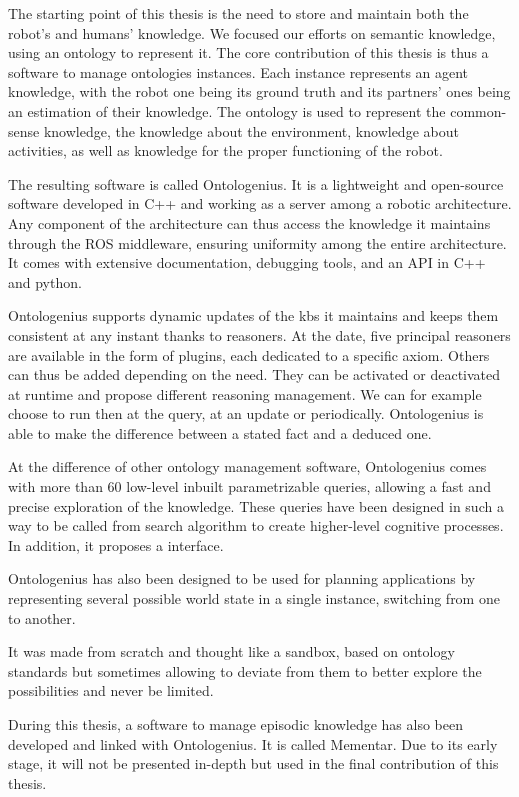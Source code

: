 The starting point of this thesis is the need to store and maintain both the robot's and humans' knowledge. We focused our efforts on semantic knowledge, using an ontology to represent it. The core contribution of this thesis is thus a software to manage ontologies instances. Each instance represents an agent knowledge, with the robot one being its ground truth and its partners' ones being an estimation of their knowledge. The ontology is used to represent the common-sense knowledge, the knowledge about the environment, knowledge about activities, as well as knowledge for the proper functioning of the robot.

The resulting software is called Ontologenius. It is a lightweight and open-source software developed in C++ and working as a server among a robotic architecture. Any component of the architecture can thus access the knowledge it maintains through the ROS middleware, ensuring uniformity among the entire architecture. It comes with extensive documentation, debugging tools, and an API in C++ and python.

Ontologenius supports dynamic updates of the \acrlong{kb}s it maintains and keeps them consistent at any instant thanks to reasoners. At the date, five principal reasoners are available in the form of plugins, each dedicated to a specific axiom. Others can thus be added depending on the need. They can be activated or deactivated at runtime and propose different reasoning management. We can for example choose to run then at the query, at an update or periodically. Ontologenius is able to make the difference between a stated fact and a deduced one.

At the difference of other ontology management software, Ontologenius comes with more than 60 low-level inbuilt parametrizable queries, allowing a fast and precise exploration of the knowledge. These queries have been designed in such a way to be called from search algorithm to create higher-level cognitive processes. In addition, it proposes a \sparql{} interface.

Ontologenius has also been designed to be used for planning applications by representing several possible world state in a single instance, switching from one to another.

It was made from scratch and thought like a sandbox, based on ontology standards but sometimes allowing to deviate from them to better explore the possibilities and never be limited.

During this thesis, a software to manage episodic knowledge has also been developed and linked with Ontologenius. It is called Mementar. Due to its early stage, it will not be presented in-depth but used in the final contribution of this thesis. 

